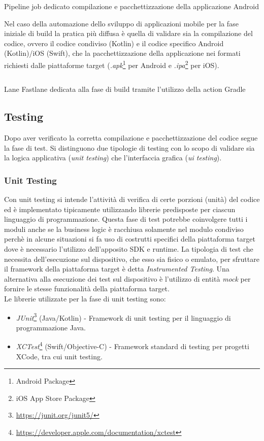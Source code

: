 \begin{listing}[H]
\inputminted{yaml}{code/4-buildjob}
\caption{Pipeline job dedicato compilazione e pacchettizzazione della applicazione Android}
\end{listing}

Nel caso della automazione dello sviluppo di applicazioni mobile per la fase iniziale di build la pratica più diffusa è quella di validare sia la compilazione del codice, ovvero il codice condiviso (Kotlin) e il codice specifico Android (Kotlin)/iOS (Swift), che la pacchettizzazione della applicazione nei formati richiesti dalle piattaforme target (\textit{.apk}\footnote{Android Package} per Android e \textit{.ipa}\footnote{iOS App Store Package} per iOS).

\begin{listing}[H]
\inputminted{ruby}{code/4-buildft}
\caption{Lane Fastlane dedicata alla fase di build tramite l'utilizzo della action Gradle}
\end{listing}

\subsection{Testing}
Dopo aver verificato la corretta compilazione e pacchettizzazione del codice segue la fase di test. Si distinguono due tipologie di testing con lo scopo di validare sia la logica applicativa (\textit{unit testing}) che l'interfaccia grafica (\textit{ui testing}).

\subsubsection{Unit Testing}
Con unit testing si intende l'attività di verifica di certe porzioni (unità) del codice ed è implementato tipicamente utilizzando librerie predisposte per ciascun linguaggio di programmazione. Questa fase di test potrebbe coinvolgere tutti i moduli anche se la business logic è racchiusa solamente nel modulo condiviso perchè in alcune situazioni si fa uso di costrutti specifici della piattaforma target dove è necessario l'utilizzo dell'apposito SDK e runtime. La tipologia di test che necessita dell'esecuzione sul dispositivo, che esso sia fisico o emulato, per sfruttare il framework della piattaforma target è detta \textit{Instrumented Testing}. Una alternativa alla esecuzione dei test sul dispositivo è l'utilizzo di entità \textit{mock} per fornire le stesse funzionalità della piattaforma target.\\
Le librerie utilizzate per la fase di unit testing sono:
\begin{itemize}
    \item \textit{JUnit}\footnote{\url{https://junit.org/junit5/}} (Java/Kotlin) - Framework di unit testing per il linguaggio di programmazione Java.
    \item \textit{XCTest}\footnote{\url{https://developer.apple.com/documentation/xctest}} (Swift/Objective-C) - Framework standard di testing per progetti XCode, tra cui unit testing.
\end{itemize}

